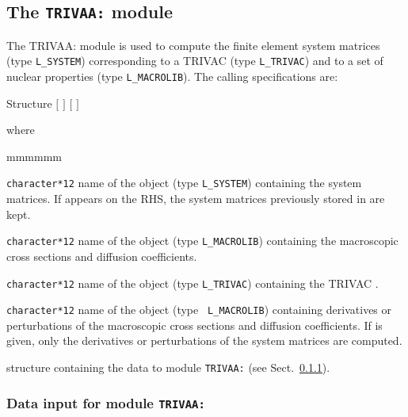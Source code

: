 \subsection{The {\tt TRIVAA:} module}

The TRIVAA: module is used to compute the finite element system matrices (type {\tt L\_SYSTEM}) corresponding to a TRIVAC  (type {\tt L\_TRIVAC}) and to a set of nuclear properties (type {\tt L\_MACROLIB}). The calling specifications are:

\begin{DataStructure}{Structure }
 \moc{:=}  $[$  $]$    $[$  $]$ \moc{::} 
\end{DataStructure}

\noindent where
\begin{ListeDeDescription}{mmmmmm}

\item[\dusa{SYST}] {\tt character*12} name of the  object (type {\tt L\_SYSTEM}) containing the system matrices. If  appears on the RHS, the system matrices previously stored in  are kept.

\item[\dusa{MACRO}] {\tt character*12} name of the  object (type {\tt L\_MACROLIB}) containing the macroscopic cross sections and diffusion coefficients.

\item[\dusa{TRACK}] {\tt character*12} name of the  object (type {\tt L\_TRIVAC}) containing the TRIVAC .

\item[\dusa{DMACRO}] {\tt character*12} name of the  object  (type {\tt
L\_MACROLIB}) containing derivatives or perturbations of the macroscopic cross
sections and diffusion coefficients. If  is given, only
the derivatives or perturbations of the system matrices are computed.

\item[\dstr{trivaa\_data}] structure containing the data to module {\tt TRIVAA:} (see Sect.~\ref{sect:trivaa_data}).

\end{ListeDeDescription}

\vskip 0.2cm

\subsubsection{Data input for module {\tt TRIVAA:}}\label{sect:trivaa_data}

